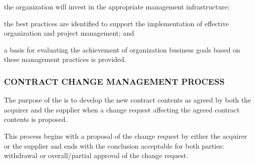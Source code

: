 			\begin{adjustwidth}{2em}{0pt} 

				\begin{compactitem}

					\item the organization will invest in the appropriate management infrastructure;

					\item the best practices are identified to support the implementation of effective organization and project management; and

					\item a basis for evaluating the achievement of organization business goals based on these management practices is provided.

				\end{compactitem}

			\end{adjustwidth}

		\newpage
		\subsubsection{CONTRACT CHANGE MANAGEMENT PROCESS\label{proc:contract_change_management_process}}

			\begin{adjustwidth}{2em}{0pt} 

				The purpose of the  is to develop the new contract contents as agreed by both the acquirer and the supplier when a change request affecting the agreed contract contents is proposed. 

				This process begins with a proposal of the change request by either the acquirer or the supplier and ends with the conclusion acceptable for both parties: withdrawal or overall/partial approval of the change request.

			\end{adjustwidth}

